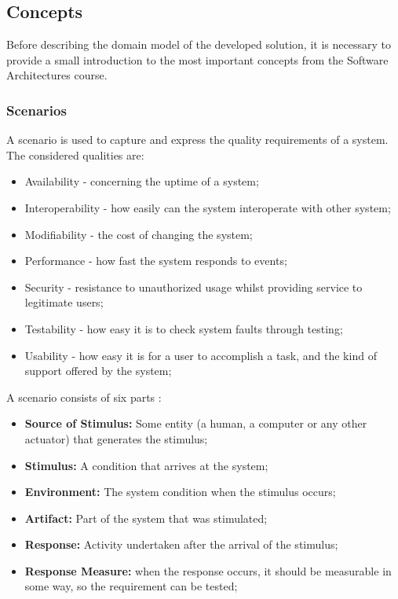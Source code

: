 \subsection{Concepts}
\label{section:SAConcepts}
Before describing the domain model of the developed solution, it is necessary to provide a small introduction to the most important concepts from the Software Architectures course.
 
\subsubsection{Scenarios}
\label{subsection:SAConceptsScenarios}
A scenario is used to capture and express the quality requirements of a system. The considered qualities are:
\begin{itemize}
\item Availability - concerning the uptime of a system;
\item Interoperability - how easily can the system interoperate with other system;
\item Modifiability - the cost of changing the system;
\item Performance - how fast the system responds to events;
\item Security - resistance to unauthorized usage whilst providing service to legitimate users;
\item Testability - how easy it is to check system faults through testing;
\item Usability - how easy it is for a user to accomplish a task, and the kind of support offered by the system;
\end{itemize}

A scenario consists of six parts \cite{bass2003software}:
\begin{itemize}
\item \textbf{Source of Stimulus:} Some entity (a human, a computer or any other actuator) that generates the stimulus;
\item \textbf{Stimulus:} A condition that arrives at the system;
\item \textbf{Environment:} The system condition when the stimulus occurs;
\item \textbf{Artifact:} Part of the system that was stimulated;
\item \textbf{Response:} Activity undertaken after the arrival of the stimulus;
\item \textbf{Response Measure:} when the response occurs, it should be measurable in some way, so the requirement can be tested;
\end{itemize}

